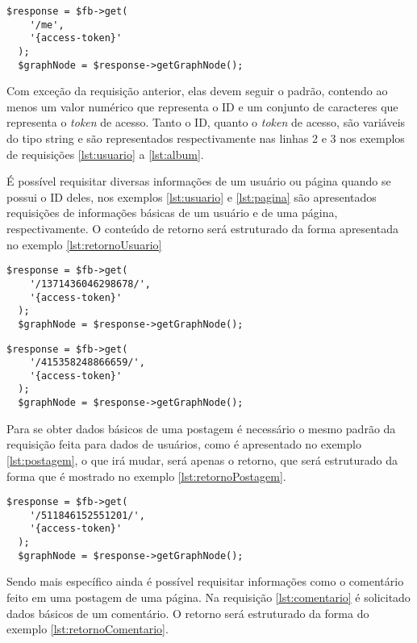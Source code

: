 \begin{lstlisting}[caption={Requisitar informações do próprio usuário},label={lst:me}]
  $response = $fb->get(
    '/me',
    '{access-token}'
  );
  $graphNode = $response->getGraphNode();
\end{lstlisting}

Com exceção da requisição anterior, elas devem seguir o padrão, contendo ao menos um valor numérico que representa o ID e um conjunto de caracteres que representa o \textit{token} de acesso. Tanto o ID, quanto o \textit{token} de acesso, são variáveis do tipo string e são representados respectivamente nas linhas 2 e 3 nos exemplos de requisições \ref{lst:usuario} a \ref{lst:album}.

É possível requisitar diversas informações de um usuário ou página quando se possui o ID deles, nos exemplos \ref{lst:usuario} e \ref{lst:pagina} são apresentados requisições de informações básicas de um usuário e de uma página, respectivamente. O conteúdo de retorno será estruturado da forma apresentada no exemplo \ref{lst:retornoUsuario}  

\begin{lstlisting}[caption={Requisitar informações de um usuário específico},label={lst:usuario}]
  $response = $fb->get(
    '/1371436046298678/',
    '{access-token}'
  );
  $graphNode = $response->getGraphNode();
\end{lstlisting}

\begin{lstlisting}[caption={Requisitar informações de uma página},label={lst:pagina}]
  $response = $fb->get(
    '/415358248866659/',
    '{access-token}'
  );
  $graphNode = $response->getGraphNode();
\end{lstlisting}

Para se obter dados básicos de uma postagem é necessário o mesmo padrão da requisição feita para dados de usuários, como é apresentado no exemplo \ref{lst:postagem}, o que irá mudar, será apenas o retorno, que será estruturado da forma que é mostrado no exemplo \ref{lst:retornoPostagem}.

\begin{lstlisting}[caption={Requisitar informações de uma postagem específica},label={lst:postagem}]
  $response = $fb->get(
    '/511846152551201/',
    '{access-token}'
  );
  $graphNode = $response->getGraphNode();
\end{lstlisting}

Sendo mais específico ainda é possível requisitar informações como o comentário feito em uma postagem de uma página. Na requisição \ref{lst:comentario} é solicitado dados básicos de um comentário. O retorno será estruturado da forma do exemplo \ref{lst:retornoComentario}.

